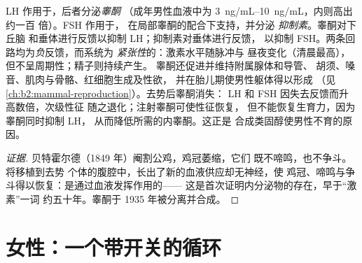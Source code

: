 \begin{proposition}[睾丸的调控]\label{prop:b2:reproductive-hormones:testis}
LH 作用于，后者分泌\emph{睾酮}
（成年男性血液中为 \qtyrange{3}{10}{ng/mL}，内则高出约一百
倍）。FSH 作用于，
在局部睾酮的配合下支持，并分泌
\emph{抑制素}。睾酮对下丘脑
和垂体进行反馈以抑制 LH；抑制素对垂体进行反馈，
以抑制 FSH。两条回路均为\emph{负}反馈，而系统为
\emph{紧张性}的：激素水平随脉冲与
昼夜变化（清晨最高），但不呈周期性；精子则持续产生。
睾酮还促进并维持附属腺体和导管、
胡须、嗓音、肌肉与骨骼、红细胞生成及性欲，
并在胎儿期使男性躯体得以形成
（见\cref{ch:b2:mammal-reproduction}）。去势后睾酮消失：
LH 和 FSH 因失去反馈而升高数倍，次级性征
随之退化；注射睾酮可使性征恢复，
但不能恢复生育力，因为睾酮同时抑制 LH，
从而降低所需的内睾酮。这正是
合成类固醇使男性不育的原因。
\end{proposition}
\begin{proof}[证据]
贝特霍尔德（1849 年）阉割公鸡，鸡冠萎缩，它们
既不啼鸣，也不争斗。将移植到去势
个体的腹腔中，长出了新的血液供应却无神经，使
鸡冠、啼鸣与争斗得以恢复：是通过血液发挥作用的——
这是首次证明内分泌物的存在，早于“激素”一词
约五十年。睾酮于 1935 年被分离并合成。
\end{proof}

\section{女性：一个带开关的循环}


